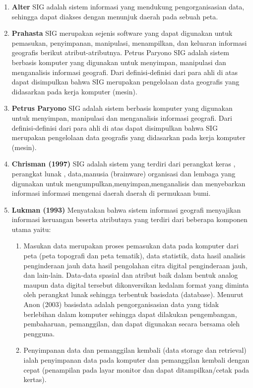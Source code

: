 \begin{enumerate}
\item \textbf{Alter}
\subitem SIG adalah sistem informasi yang mendukung pengorganisasian data, sehingga dapat diakses dengan menunjuk daerah pada sebuah peta.

\item \textbf{Prahasta}
\subitem SIG merupakan sejenis software yang dapat digunakan untuk pemasukan, penyimpanan, manipulasi, menampilkan, dan keluaran informasi geografis berikut atribut-atributnya.  Petrus Paryono SIG adalah sistem berbasis komputer yang digunakan untuk menyimpan, manipulasi dan menganalisis informasi geografi. Dari definisi-definisi dari para ahli di atas dapat disimpulkan bahwa SIG merupakan pengelolaan data geografis yang didasarkan pada kerja komputer (mesin).

\item \textbf{Petrus Paryono}
\subitem SIG adalah sistem berbasis komputer yang digunakan untuk menyimpan, manipulasi dan menganalisis informasi geografi. Dari definisi-definisi dari para ahli di atas dapat disimpulkan bahwa SIG merupakan pengelolaan data geografis yang didasarkan pada kerja komputer (mesin).

\item \textbf{Chrisman (1997)}
\subitem SIG adalah sistem yang terdiri dari perangkat keras , perangkat lunak , data,manusia (brainware) organisasi dan lembaga yang digunakan untuk mengumpulkan,menyimpan,menganalisis dan menyebarkan informasi informasi mengenai daerah daerah di permukaan bumi.

\item \textbf{Lukman (1993)}
\subitem Menyatakan bahwa sistem informasi geografi menyajikan informasi keruangan beserta atributnya yang terdiri dari beberapa komponen utama yaitu:
\begin{enumerate}
\item Masukan data merupakan proses pemasukan data pada komputer dari peta (peta topografi dan peta tematik), data statistik, data hasil analisis penginderaan jauh data hasil pengolahan citra digital penginderaan jauh, dan lain-lain. Data-data spasial dan atribut baik dalam bentuk analog maupun data digital tersebut dikonversikan kedalam format yang diminta oleh perangkat lunak sehingga terbentuk basisdata (database). Menurut Anon (2003) basisdata adalah pengorganisasian data yang tidak berlebihan dalam komputer sehingga dapat dilakukan pengembangan, pembaharuan, pemanggilan, dan dapat digunakan secara bersama oleh pengguna.

\item Penyimpanan data dan pemanggilan kembali (data storage dan retrieval) ialah penyimpanan data pada komputer dan pemanggilan kembali dengan cepat (penampilan pada layar monitor dan dapat ditampilkan/cetak pada kertas).


\end{enumerate}
\end{enumerate}
